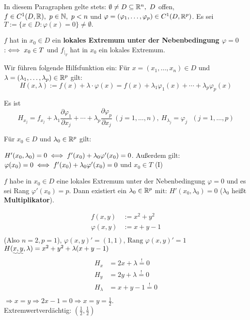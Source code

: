 \documentclass[a4paper,oneside,DIV15,BCOR12mm,chapterprefix=true,headings=onelinechapter]{scrbook}
\begin{document}
In diesem Paragraphen gelte stets: $\emptyset \ne D \subseteq \mathbb{R}^n,\ D$ offen, $f \in C^1(D,\MdR),\ p \in \MdN,\ p<n$ und $\varphi = (\varphi_1,\ldots,\varphi_p) \in C^1(D,\mathbb{R}^p)$. Es sei $T:=\{x\in D: \varphi(x) = 0\} \ne \emptyset.$

\begin{definition}
    $f$ hat in $x_0\in D$ ein \textbf{lokales Extremum unter der Nebenbedingung 
    $\varphi = 0$} $:\iff x_0 \in T$ und $f_{|_T}$ hat in $x_0$ ein lokales Extremum.
\end{definition}

Wir führen folgende Hilfsfunktion ein: Für $x=(x_1,\ldots,x_n) \in D$ und 
$\lambda = (\lambda_1,\ldots,\lambda_p) \in \mathbb{R}^p$ gilt: 
\[ H(x,\lambda) := f(x) + \lambda\cdot\varphi(x) = f(x) + \lambda_1\varphi_1(x) + \cdots + \lambda_p\varphi_p(x)\]

Es ist 
\[ H_{x_j} = f_{x_j} + \lambda_1\frac{\partial\varphi_1}{\partial x_j} + \cdots +\lambda_p\frac{\partial\varphi_p}{\partial x_j}\ (j=1,\ldots,n),\ H_{\lambda_j} = \varphi_j ~~~ (j = 1, \dots, p)\]

Für $x_0 \in D$ und $\lambda_0 \in \mathbb{R}^p$ gilt:

$H'(x_0,\lambda_0) = 0 \iff f'(x_0) + \lambda_0\varphi'(x_0) = 0$. Außerdem gilt:\\
$\varphi(x_0) = 0 \iff f'(x_0) + \lambda_0\varphi'(x_0) = 0$ und $x_0 \in T$ (I)

\begin{satz}
    $f$ habe in $x_0\in D$ eine lokales Extremum unter der Nebenbedingung 
    $\varphi=0$ und es sei Rang $\varphi'(x_0) = p$. Dann existiert ein 
    $\lambda_0 \in \mathbb{R}^p$ mit: $H'(x_0,\lambda_0) = 0$ ($\lambda_0$ heißt \textbf{Multiplikator}).
\end{satz}

\begin{beispiel}
    \begin{align*}
        f(x, y)       &:= x^2 + y^2\\
        \varphi(x, y) &:= x + y -1\\
    \end{align*}
    (Also $n=2, p=1$), $\varphi(x,y)' = (1,1)$, $\text{Rang } \varphi(x,y)' = 1$\\
    $H(\uwave{x,y}, \lambda) = x^2 + y^2 + \lambda (x+y-1)$\\
    \begin{align*}
        H_x       &= 2x + \lambda \stackrel{!}{=} 0\\
        H_y       &= 2y + \lambda \stackrel{!}{=} 0\\
        H_\lambda &= x+y-1 \stackrel{!}{=} 0\\
    \end{align*}
    $\Rightarrow x=y \Rightarrow 2x-1 = 0 \Rightarrow x = y = \frac{1}{2}$.\\
    Extremwertverdächtig: $(\frac{1}{2}, \frac{1}{2})$
\end{beispiel}
\end{document}
